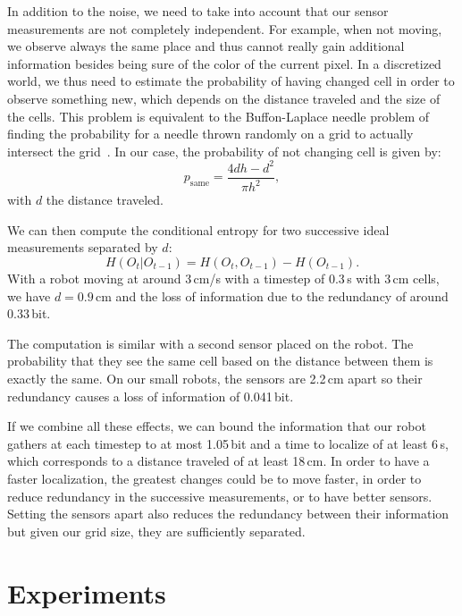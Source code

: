 \documentclass[letterpaper, 10pt, conference]{ieeeconf}
\begin{document}
In addition to the noise, we need to take into account that our sensor measurements are not completely independent.
For example, when not moving, we observe always the same place and thus cannot really gain additional information besides being sure of the color of the current pixel.
In a discretized world, we thus need to estimate the probability of having changed cell in order to observe something new, which depends on the distance traveled and the size of the cells.
This problem is equivalent to the Buffon-Laplace needle problem of finding the probability for a needle thrown randomly on a grid to actually intersect the grid~\cite{laplace1820prob}.
In our case, the probability of not changing cell is given by:
\begin{displaymath}
	p_\mathrm{same} = \frac{4d h - d^2}{\pi h^2},
\end{displaymath}
with $d$ the distance traveled.

We can then compute the conditional entropy for two successive ideal measurements separated by $d$:
\begin{displaymath}
	H(O_t | O_{t-1}) = H(O_t, O_{t-1}) - H(O_{t-1}).
\end{displaymath}
With a robot moving at around 3\,cm/s with a timestep of 0.3\,s with 3\,cm cells, we have $d=0.9$\,cm and the loss of information due to the redundancy of around 0.33\,bit.

The computation is similar with a second sensor placed on the robot.
The probability that they see the same cell based on the distance between them is exactly the same.
On our small robots, the sensors are 2.2\,cm apart so their redundancy causes a loss of information of 0.041\,bit.

If we combine all these effects, we can bound the information that our robot gathers at each timestep to at most 1.05\,bit and a time to localize of at least 6\,s, which corresponds to a distance traveled of at least 18\,cm.
In order to have a faster localization, the greatest changes could be to move faster, in order to reduce redundancy in the successive measurements, or to have better sensors. %
Setting the sensors apart also reduces the redundancy between their information but given our grid size, they are sufficiently separated.

\section{Experiments}
\end{document}
